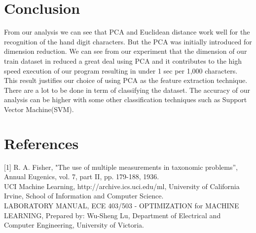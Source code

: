 \section{Conclusion}
\label{sect:conclusion}
From our analysis we can see that PCA and Euclidean distance work well for the recognition of the hand digit characters. But the PCA was initially introduced for dimension reduction. We can see from our experiment that the dimension of our train dataset in reduced a great deal using PCA and it contributes to the high speed execution of our program resulting in under 1 sec per 1,000 characters. This result justifies our choice of using PCA as the feature extraction technique. There are a lot to be done in term of classifying the dataset. The accuracy of our analysis can be higher with some other classification techniques such as Support Vector Machine(SVM).

\section{References}
[1] R. A. Fisher, "The use of multiple measurements in taxonomic problems”, Annual Eugenics,
vol. 7, part II, pp. 179-188, 1936. \\\relax
[2] UCI Machine Learning, http://archive.ics.uci.edu/ml, University of California Irvine, School of
Information and Computer Science. \\\relax
[3] LABORATORY MANUAL, ECE 403/503 - OPTIMIZATION for MACHINE LEARNING, Prepared by: Wu-Sheng Lu, Department of Electrical and Computer Engineering, University of Victoria.
   